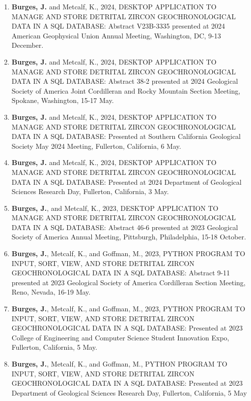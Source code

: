 \documentclass{res} %
\newcommand\reverselabel[1]{%
  \def\theenumi{}%
  \renewcommand\makelabel{\makebox[\dimexpr\labelwidth-3pt\relax][r]{%
    \the\numexpr#1-\value{enumi}+1\relax}}}%
\begin{document}
\begin{resume}
\begin{enumerate}
\reverselabel{8}%
\setlength{\itemindent}{-.25in}

\item \textbf{Burges, J.} and Metcalf, K., 2024, DESKTOP APPLICATION TO MANAGE AND STORE DETRITAL ZIRCON
GEOCHRONOLOGICAL DATA IN A SQL DATABASE: Abstract V23B-3335 presented at 2024 American 
Geophysical Union Annual Meeting, Washington, DC, 9-13 December.

\item \textbf{Burges, J.} and Metcalf, K., 2024, DESKTOP APPLICATION TO MANAGE AND STORE DETRITAL ZIRCON
GEOCHRONOLOGICAL DATA IN A SQL DATABASE: Abstract 38-2 presented at 2024 Geological Society of
America Joint Cordilleran and Rocky Mountain Section Meeting, Spokane, Washington, 15-17 May.
\item \textbf{Burges, J.} and Metcalf, K., 2024, DESKTOP APPLICATION TO MANAGE AND STORE DETRITAL ZIRCON
GEOCHRONOLOGICAL DATA IN A SQL DATABASE: Presented at Southern California Geological Society
May 2024 Meeting, Fullerton, California, 6 May.
\item \textbf{Burges, J.} and Metcalf, K., 2024, DESKTOP APPLICATION TO MANAGE AND STORE DETRITAL ZIRCON
GEOCHRONOLOGICAL DATA IN A SQL DATABASE: Presented at 2024 Department of Geological Sciences
Research Day, Fullerton, California, 3 May.

\item \textbf{Burges, J.}, and Metcalf, K., 2023, DESKTOP APPLICATION TO MANAGE AND STORE
DETRITAL ZIRCON GEOCHRONOLOGICAL DATA IN A SQL DATABASE: Abstract
46-6 presented at 2023 Geological Society of America Annual Meeting, Pittsburgh, Philadelphia, 15-18
October.
\item \textbf{Burges, J.}, Metcalf, K., and Goffman, M., 2023, PYTHON PROGRAM TO INPUT, SORT, VIEW, AND STORE
DETRITAL ZIRCON GEOCHRONOLOGICAL DATA IN A SQL DATABASE: Abstract 9-11 presented at 2023
Geological Society of America Cordilleran Section Meeting, Reno, Nevada, 16-19 May.
\item \textbf{Burges, J.}, Metcalf, K., and Goffman, M., 2023, PYTHON PROGRAM TO INPUT, SORT, VIEW, AND STORE
DETRITAL ZIRCON GEOCHRONOLOGICAL DATA IN A SQL DATABASE: Presented at 2023 College of
Engineering and Computer Science Student Innovation Expo, Fullerton, California, 5 May.
\item \textbf{Burges, J.}, Metcalf, K., and Goffman, M., PYTHON PROGRAM TO INPUT, SORT, VIEW, AND STORE DETRITAL
ZIRCON GEOCHRONOLOGICAL DATA IN A SQL DATABASE: Presented at 2023 Department of Geological
Sciences Research Day, Fullerton, California, 5 May
\end{enumerate}


\end{resume}
\end{document}
